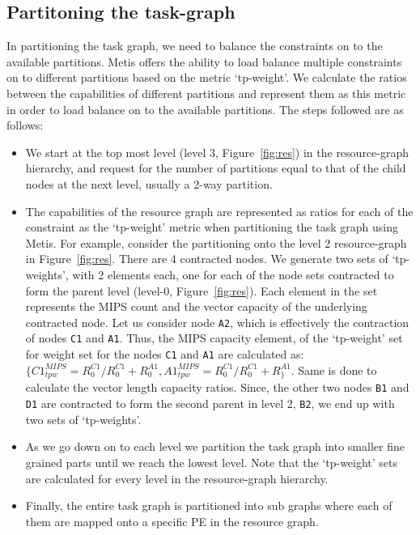 \subsection{Partitoning the task-graph}
\label{sec:part-task-graph}

In partitioning the task graph, we need to balance the constraints on to
the available partitions. Metis offers the ability to load balance
multiple constraints on to different partitions based on the metric
\mbox{`tp-weight'}. We calculate the ratios between the capabilities of
different partitions and represent them as this metric in order to load
balance on to the available partitions. The steps followed are as
follows:

\begin{itemize}

\item We start at the top most level (level 3, Figure~\ref{fig:res}) in
  the resource-graph hierarchy, and request for the number of partitions
  equal to that of the child nodes at the next level, usually a 2-way
  partition.

\item The capabilities of the resource graph are represented as ratios
  for each of the constraint as the `tp-weight' metric when partitioning
  the task graph using Metis. For example, consider the partitioning
  onto the level 2 resource-graph in Figure~\ref{fig:res}. There are 4
  contracted nodes. We generate two sets of `tp-weights', with 2
  elements each, one for each of the node sets contracted to form the
  parent level (level-0, Figure~\ref{fig:res}). Each element in the set
  represents the MIPS count and the vector capacity of the underlying
  contracted node. Let us consider node \texttt{A2}, which is
  effectively the contraction of nodes \texttt{C1} and
  \texttt{A1}. Thus, the MIPS capacity element, of the `tp-weight' set
  for weight set for the nodes \texttt{C1} and \texttt{A1} are
  calculated as: \mbox{$\{C1^{MIPS}_{tpw} = R^{C1}_0/R^{C1}_0 +
    R^{A1}_0, A1^{MIPS}_{tpw} = R^{C1}_0/R^{C1}_0 + R^{A1}_\}$}. Same is
  done to calculate the vector length capacity ratios. Since, the other
  two nodes \texttt{B1} and \texttt{D1} are contracted to form the
  second parent in level 2, \texttt{B2}, we end up with two sets of
  `tp-weights'.

\item As we go down on to each level we partition the task graph into
  smaller fine grained parts until we reach the lowest level. Note that
  the `tp-weight' sets are calculated for every level in the
  resource-graph hierarchy.

\item Finally, the entire task graph is partitioned into sub graphs
  where each of them are mapped onto a specific PE in the resource
  graph.

\end{itemize}


